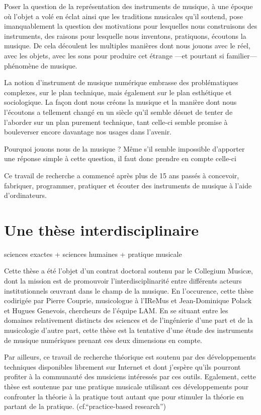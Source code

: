 Poser la question de la représentation des instruments de musique, à une époque où l’objet a volé en éclat ainsi que les traditions musicales qu’il soutend, pose imanquablement la question des motivations pour lesquelles nous construisons des instruments, des raisons pour lesquelle nous inventons, pratiquons, écoutons la musique. De cela découlent les multiples manières dont nous jouons avec le réel, avec les objets, avec les sons pour produire cet étrange —et pourtant si familier— phénomène de musique.

La notion d’instrument de musique numérique embrasse des problématiques complexes, sur le plan technique, mais également sur le plan esthétique et sociologique. La façon dont nous créons la musique et la manière dont nous l’écoutons a tellement changé en un siècle qu’il semble désuet de tenter de l’aborder sur un plan purement technique, tant celle-ci semble promise à bouleverser encore davantage nos usages dans l’avenir.

Pourquoi jouons nous de la musique ?
Même s’il semble impossible d’apporter une réponse simple à cette question, il faut donc prendre en compte celle-ci 


Ce travail de recherche a commencé après plus de 15 ans passés à concevoir, fabriquer, programmer, pratiquer et écouter des instruments de musique à l'aide d'ordinateurs. 


\section{Une thèse interdisciplinaire}

sciences exactes + sciences humaines + pratique musicale

Cette thèse a été l'objet d'un contrat doctoral soutenu par le Collegium Musicæ, dont la mission est de promouvoir l'interdisciplinarité entre différents acteurs institutionnels œuvrant dans le champ de la musique. En l'occurence, cette thèse codirigée par Pierre Couprie, musicologue à l'\gls{IReMus} et Jean-Dominique Polack et Hugues Genevois, chercheurs de l'équipe \gls{LAM}.
En se situant entre les domaines relativement distincts des sciences et de l'ingénierie d'une part et de la musicologie d'autre part, cette thèse est la tentative d'une étude des instruments de musique numériques prenant ces deux dimensions en compte.

Par ailleurs, ce travail de recherche théorique est soutenu par des développements techniques disponibles librement sur Internet et dont j'espère qu'ils pourront profiter à la communauté des musiciens intéressés par ces outils.
Egalement, cette thèse est soutenue par une pratique musicale utilisant ces développements pour confronter la théorie à la pratique tout autant que pour stimuler la théorie en partant de la pratique. (cf.``practice-based research'')

